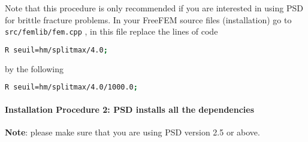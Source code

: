 Note that this procedure is only recommended if you are interested in
using PSD for brittle fracture problems. In your FreeFEM source files
(installation) go to \lstinline!src/femlib/fem.cpp! , in this file
replace the lines of code

\begin{lstlisting}[language=bash]
R seuil=hm/splitmax/4.0;
\end{lstlisting}

by the following

\begin{lstlisting}[language=bash]
R seuil=hm/splitmax/4.0/1000.0;
\end{lstlisting}

\paragraph{Installation Procedure 2: PSD installs all the dependencies}

\textbf{Note}: please make sure that you are using PSD version 2.5 or
above.

